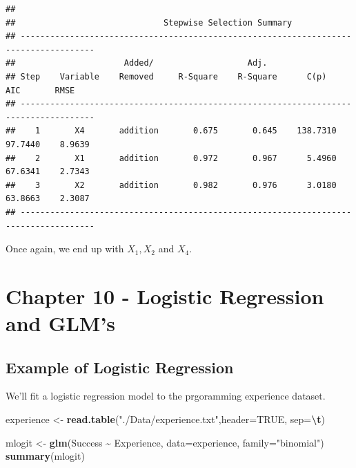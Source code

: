 \documentclass[
  11pt,
]{article}
\newenvironment{Shaded}{\begin{snugshade}}{\end{snugshade}}
\newcommand{\AttributeTok}[1]{\textcolor[rgb]{0.13,0.29,0.53}{#1}}
\newcommand{\ConstantTok}[1]{\textcolor[rgb]{0.56,0.35,0.01}{#1}}
\newcommand{\FunctionTok}[1]{\textcolor[rgb]{0.13,0.29,0.53}{\textbf{#1}}}
\newcommand{\NormalTok}[1]{#1}
\newcommand{\OtherTok}[1]{\textcolor[rgb]{0.56,0.35,0.01}{#1}}
\newcommand{\SpecialCharTok}[1]{\textcolor[rgb]{0.81,0.36,0.00}{\textbf{#1}}}
\newcommand{\StringTok}[1]{\textcolor[rgb]{0.31,0.60,0.02}{#1}}
\begin{document}
\begin{verbatim}
## 
##                              Stepwise Selection Summary                               
## -------------------------------------------------------------------------------------
##                      Added/                   Adj.                                       
## Step    Variable    Removed     R-Square    R-Square      C(p)        AIC       RMSE     
## -------------------------------------------------------------------------------------
##    1       X4       addition       0.675       0.645    138.7310    97.7440    8.9639    
##    2       X1       addition       0.972       0.967      5.4960    67.6341    2.7343    
##    3       X2       addition       0.982       0.976      3.0180    63.8663    2.3087    
## -------------------------------------------------------------------------------------
\end{verbatim}

Once again, we end up with \(X_1,X_2\) and \(X_4\).

\section{Chapter 10 - Logistic Regression and
GLM's}\label{chapter-10---logistic-regression-and-glms}

\subsection{Example of Logistic
Regression}\label{example-of-logistic-regression}

We'll fit a logistic regression model to the prgoramming experience
dataset.

\begin{Shaded}
\begin{Highlighting}[]
\NormalTok{experience }\OtherTok{\textless{}{-}} \FunctionTok{read.table}\NormalTok{(}\StringTok{"./Data/experience.txt"}\NormalTok{,}\AttributeTok{header=}\ConstantTok{TRUE}\NormalTok{, }\AttributeTok{sep=}\StringTok{\textquotesingle{}}\SpecialCharTok{\textbackslash{}t}\StringTok{\textquotesingle{}}\NormalTok{)}

\NormalTok{mlogit }\OtherTok{\textless{}{-}} \FunctionTok{glm}\NormalTok{(Success }\SpecialCharTok{\textasciitilde{}}\NormalTok{ Experience, }\AttributeTok{data=}\NormalTok{experience, }\AttributeTok{family=}\StringTok{"binomial"}\NormalTok{)}
\FunctionTok{summary}\NormalTok{(mlogit)}
\end{Highlighting}
\end{Shaded}
\end{document}
